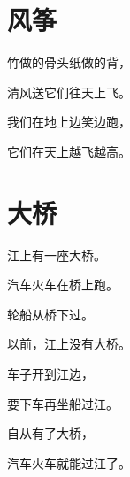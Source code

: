 \documentclass[12pt,UTF-8,openany]{ctexbook}
\begin{document}
\hanzibox{}\hanzibox{}\hanzibox{}\hanzibox{}\hspace{1em}\hanzibox{}\hanzibox{}\hanzibox{}\hanzibox{}

\hanzibox{}\hanzibox{}\hanzibox{}\hanzibox{}\hspace{1em}\hanzibox{}\hanzibox{}\hanzibox{}\hanzibox{}






\chapter{风筝}

\begin{large}
    
    竹做的骨头纸做的背，
    
    清风送它们往天上飞。
    
    我们在地上边笑边跑，
    
    它们在天上越飞越高。
    
\end{large}


\clearpage

\begin{center}
    
\end{center}


\hanzibox{}\hanzibox{}\hanzibox{}\hanzibox{}\hspace{1em}\hanzibox{}\hanzibox{}\hanzibox{}\hanzibox{}

\hanzibox{}\hanzibox{}\hanzibox{}\hanzibox{}\hspace{1em}\hanzibox{}\hanzibox{}\hanzibox{}\hanzibox{}

\hanzibox{}\hanzibox{}\hanzibox{}\hanzibox{}\hspace{1em}\hanzibox{}\hanzibox{}\hanzibox{}\hanzibox{}

\hanzibox{}\hanzibox{}\hanzibox{}\hanzibox{}\hspace{1em}




\chapter{大桥}

\begin{large}
    
    江上有一座大桥。
    
    汽车火车在桥上跑。
    
    轮船从桥下过。
    
    以前，江上没有大桥。
    
    车子开到江边，
    
    要下车再坐船过江。
    
    自从有了大桥，
    
    汽车火车就能过江了。
    
\end{large}
\end{document}
